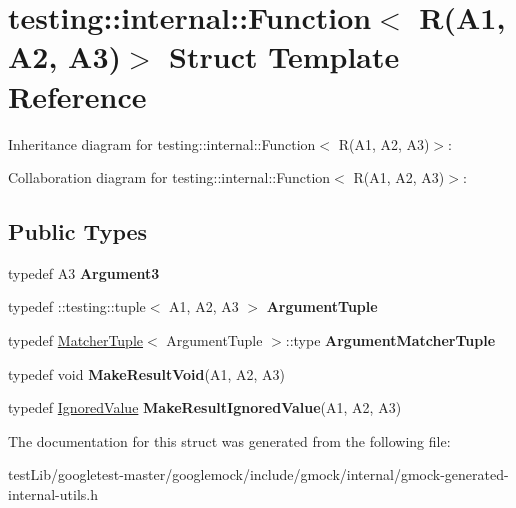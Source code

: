 \hypertarget{structtesting_1_1internal_1_1Function_3_01R_07A1_00_01A2_00_01A3_08_4}{}\section{testing\+:\+:internal\+:\+:Function$<$ R(A1, A2, A3)$>$ Struct Template Reference}
\label{structtesting_1_1internal_1_1Function_3_01R_07A1_00_01A2_00_01A3_08_4}


Inheritance diagram for testing\+:\+:internal\+:\+:Function$<$ R(A1, A2, A3)$>$\+:


Collaboration diagram for testing\+:\+:internal\+:\+:Function$<$ R(A1, A2, A3)$>$\+:
\subsection*{Public Types}
\begin{DoxyCompactItemize}
\item 
\mbox{\label{structtesting_1_1internal_1_1Function_3_01R_07A1_00_01A2_00_01A3_08_4_a2ac6eefb33feafe85c1c6742bdab509f}} 
typedef A3 {\bfseries Argument3}
\item 
\mbox{\label{structtesting_1_1internal_1_1Function_3_01R_07A1_00_01A2_00_01A3_08_4_a6f1e1097947a9e13a4e29099a61de804}} 
typedef \+::testing\+::tuple$<$ A1, A2, A3 $>$ {\bfseries Argument\+Tuple}
\item 
\mbox{\label{structtesting_1_1internal_1_1Function_3_01R_07A1_00_01A2_00_01A3_08_4_acb08fa0fffe1213ce88f53343bb3b564}} 
typedef \hyperlink{structtesting_1_1internal_1_1MatcherTuple}{Matcher\+Tuple}$<$ Argument\+Tuple $>$\+::type {\bfseries Argument\+Matcher\+Tuple}
\item 
\mbox{\label{structtesting_1_1internal_1_1Function_3_01R_07A1_00_01A2_00_01A3_08_4_a6b9f583a9ef6755cc92ce2b7fa255b84}} 
typedef void {\bfseries Make\+Result\+Void}(A1, A2, A3)
\item 
\mbox{\label{structtesting_1_1internal_1_1Function_3_01R_07A1_00_01A2_00_01A3_08_4_abff7468ae8231766e7b396c8a407cb5a}} 
typedef \hyperlink{classtesting_1_1internal_1_1IgnoredValue}{Ignored\+Value} {\bfseries Make\+Result\+Ignored\+Value}(A1, A2, A3)
\end{DoxyCompactItemize}


The documentation for this struct was generated from the following file\+:\begin{DoxyCompactItemize}
\item 
test\+Lib/googletest-\/master/googlemock/include/gmock/internal/gmock-\/generated-\/internal-\/utils.\+h\end{DoxyCompactItemize}
